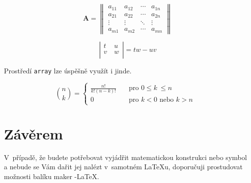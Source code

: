 \documentclass[11pt, a4paper, twocolumn, czech]{article}
\theoremstyle{definition}
\begin{document}
 $$ \mathbf{A} = \left\| \begin{array}{cccc}
a_{11} & a_{12} & \cdots & a_{1n} \\
a_{21} & a_{22} & \cdots & a_{2n} \\
\vdots & \vdots & \ddots & \vdots \\
a_{m1} & a_{m2} & \cdots & a_{mn} \end{array} \right\|$$ 

$$\left| \begin{array}{cc}
t & u~\\
v~& w \\
\end{array} \right| = tw-uv $$

Prostředí \texttt{array} lze úspěšně využít i jinde.

$${n\choose k} = \left\{ \begin{array}{ll}
\frac{n!}{k!(n-k)!} & \quad \mbox{pro $0 \leq k~\leq n$ }\\
0 & \quad \mbox{pro $k<0$ nebo $k>n$ } \end{array} \right.$$ 

\section{Závěrem}

V~případě, že budete potřebovat vyjádřit matematickou konstrukci nebo symbol a nebude se Vám dařit jej nalézt v~samotném \LaTeX u, doporučuji prostudovat možnosti balíku maker \AmS-\LaTeX.
\end{document}
